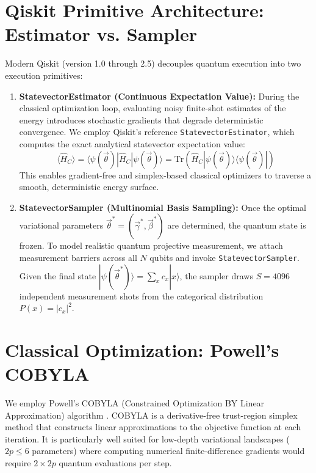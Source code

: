 \section{Qiskit Primitive Architecture: Estimator vs. Sampler}
Modern Qiskit (version 1.0 through 2.5) decouples quantum execution into two execution primitives:
\begin{enumerate}
    \item \textbf{StatevectorEstimator (Continuous Expectation Value):}
    During the classical optimization loop, evaluating noisy finite-shot estimates of the energy introduces stochastic gradients that degrade deterministic convergence. We employ Qiskit's reference \texttt{StatevectorEstimator}, which computes the exact analytical statevector expectation value:
    \begin{equation}
    \langle \hat{H}_C \rangle = \langle \psi(\vec{\theta}) | \hat{H}_C | \psi(\vec{\theta}) \rangle = \text{Tr}\left( \hat{H}_C |\psi(\vec{\theta})\rangle \langle \psi(\vec{\theta})| \right)
    \end{equation}
    This enables gradient-free and simplex-based classical optimizers to traverse a smooth, deterministic energy surface.
    
    \item \textbf{StatevectorSampler (Multinomial Basis Sampling):}
    Once the optimal variational parameters $\vec{\theta}^* = (\vec{\gamma}^*, \vec{\beta}^*)$ are determined, the quantum state is frozen. To model realistic quantum projective measurement, we attach measurement barriers across all $N$ qubits and invoke \texttt{StatevectorSampler}. Given the final state $|\psi(\vec{\theta}^*)\rangle = \sum_{x} c_x |x\rangle$, the sampler draws $S = 4096$ independent measurement shots from the categorical distribution $P(x) = |c_x|^2$.
\end{enumerate}

\section{Classical Optimization: Powell's COBYLA}
We employ Powell's COBYLA (Constrained Optimization BY Linear Approximation) algorithm \cite{powell1994cobyla}. COBYLA is a derivative-free trust-region simplex method that constructs linear approximations to the objective function at each iteration. It is particularly well suited for low-depth variational landscapes ($2p \le 6$ parameters) where computing numerical finite-difference gradients would require $2 \times 2p$ quantum evaluations per step.

